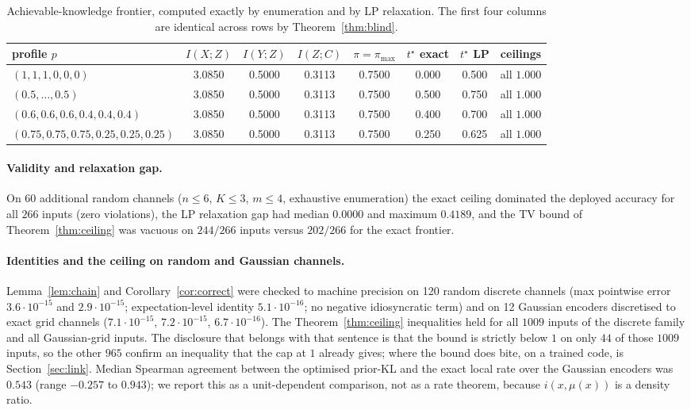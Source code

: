 \documentclass[11pt]{article}
\begin{document}
\begin{table}[t]\centering\small
\caption{Achievable-knowledge frontier, computed exactly by enumeration and by LP relaxation.
The first four columns are identical across rows by Theorem~\ref{thm:blind}.}
\label{tab:frontier}
\begin{tabular}{lccccccc}
\toprule
profile $p$ & $I(X;Z)$ & $I(Y;Z)$ & $I(Z;C)$ & $\pi=\pi_{\max}$ & $t^\star$ exact & $t^\star$ LP & ceilings \\
\midrule
$(1,1,1,0,0,0)$ & 3.0850 & 0.5000 & 0.3113 & 0.7500 & 0.000 & 0.500 & all $1.000$\\
$(0.5,\dots,0.5)$ & 3.0850 & 0.5000 & 0.3113 & 0.7500 & 0.500 & 0.750 & all $1.000$\\
$(0.6,0.6,0.6,0.4,0.4,0.4)$ & 3.0850 & 0.5000 & 0.3113 & 0.7500 & 0.400 & 0.700 & all $1.000$\\
$(0.75,0.75,0.75,0.25,0.25,0.25)$ & 3.0850 & 0.5000 & 0.3113 & 0.7500 & 0.250 & 0.625 & all $1.000$\\
\bottomrule
\end{tabular}
\end{table}

\paragraph{Validity and relaxation gap.} On 60 additional random channels ($n\le6$, $K\le3$,
$m\le4$, exhaustive enumeration) the exact ceiling dominated the deployed accuracy for all $266$
inputs (zero violations), the LP relaxation gap had median $0.0000$ and maximum $0.4189$, and the
TV bound of Theorem~\ref{thm:ceiling} was vacuous on $244/266$ inputs versus $202/266$ for the
exact frontier.

\paragraph{Identities and the ceiling on random and Gaussian channels.} Lemma~\ref{lem:chain} and
Corollary~\ref{cor:correct} were checked to machine precision on 120 random discrete channels
(max pointwise error $3.6\cdot10^{-15}$ and $2.9\cdot10^{-15}$; expectation-level identity
$5.1\cdot10^{-16}$; no negative idiosyncratic term) and on 12 Gaussian encoders discretised to
exact grid channels ($7.1\cdot10^{-15}$, $7.2\cdot10^{-15}$, $6.7\cdot10^{-16}$). The
Theorem~\ref{thm:ceiling} inequalities held for all $1009$ inputs of the discrete family and all
Gaussian-grid inputs. The disclosure that belongs with that sentence is that the bound is strictly
below $1$ on only $44$ of those $1009$ inputs, so the other $965$ confirm an inequality that the cap
at $1$ already gives; where the bound does bite, on a trained code, is Section~\ref{sec:link}. Median Spearman agreement between the optimised prior-KL and the exact
local rate over the Gaussian encoders was $0.543$ (range $-0.257$ to $0.943$); we report this as
a unit-dependent comparison, not as a rate theorem, because $i(x,\mu(x))$ is a density ratio.
\end{document}

